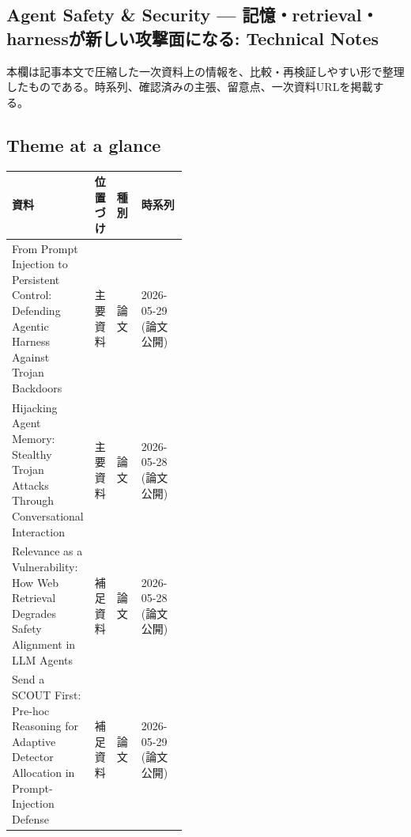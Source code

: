\subsection*{Agent Safety \& Security — 記憶・retrieval・harnessが新しい攻撃面になる: Technical Notes}
本欄は記事本文で圧縮した一次資料上の情報を、比較・再検証しやすい形で整理したものである。時系列、確認済みの主張、留意点、一次資料URLを掲載する。
\medskip
\subsection*{Theme at a glance}
\begin{center}
\footnotesize
\begin{tabularx}{\linewidth}{@{}p{0.20\linewidth}p{0.10\linewidth}p{0.14\linewidth}X@{}}
\toprule
資料 & 位置づけ & 種別 & 時系列 \\
\midrule
From Prompt Injection to Persistent Control: Defending Agentic Harness Against Trojan Backdoors & 主要資料 & 論文 & 2026-05-29 (論文公開) \\
Hijacking Agent Memory: Stealthy Trojan Attacks Through Conversational Interaction & 主要資料 & 論文 & 2026-05-28 (論文公開) \\
Relevance as a Vulnerability: How Web Retrieval Degrades Safety Alignment in LLM Agents & 補足資料 & 論文 & 2026-05-28 (論文公開) \\
Send a SCOUT First: Pre-hoc Reasoning for Adaptive Detector Allocation in Prompt-Injection Defense & 補足資料 & 論文 & 2026-05-29 (論文公開) \\
\bottomrule
\end{tabularx}
\end{center}
\normalsize

